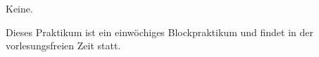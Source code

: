 \begin{course}

\setdoclanguagegerman
{}
\coursecoordination{}


\courseterm{}

\coursehead


\label{cour_14459.dp_997}


\begin{styleenv}
\begin{assessment}

\end{assessment}

\begin{conditions}Keine.\end{conditions}


\end{styleenv}

\begin{learningoutcomes}

\end{learningoutcomes}

\begin{content}

\end{content}





\begin{remarks}Dieses Praktikum ist ein einwöchiges Blockpraktikum und findet in der vorlesungsfreien Zeit statt.

\end{remarks}

\end{course}